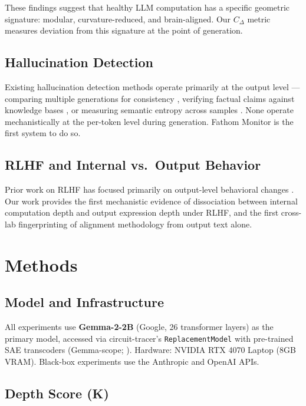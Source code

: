 \documentclass[10pt]{article}
\begin{document}
These findings suggest that healthy LLM computation has a specific geometric signature: modular, curvature-reduced, and brain-aligned. Our $C_{\Delta}$ metric measures deviation from this signature at the point of generation.

\subsection{Hallucination Detection}

Existing hallucination detection methods operate primarily at the output level --- comparing multiple generations for consistency \citep{manakul2023}, verifying factual claims against knowledge bases \citep{min2023}, or measuring semantic entropy across samples \citep{kuhn2023}. None operate mechanistically at the per-token level during generation. Fathom Monitor is the first system to do so.

\subsection{RLHF and Internal vs.\ Output Behavior}

Prior work on RLHF has focused primarily on output-level behavioral changes \citep{ouyang2022, bai2022}. Our work provides the first mechanistic evidence of dissociation between internal computation depth and output expression depth under RLHF, and the first cross-lab fingerprinting of alignment methodology from output text alone.

\section{Methods}

\subsection{Model and Infrastructure}

All experiments use \textbf{Gemma-2-2B} (Google, 26 transformer layers) as the primary model, accessed via circuit-tracer's \texttt{ReplacementModel} with pre-trained SAE transcoders (Gemma-scope; \citealt{lindsey2024}). Hardware: NVIDIA RTX 4070 Laptop (8GB VRAM). Black-box experiments use the Anthropic and OpenAI APIs.

\subsection{Depth Score (K)}
\end{document}
